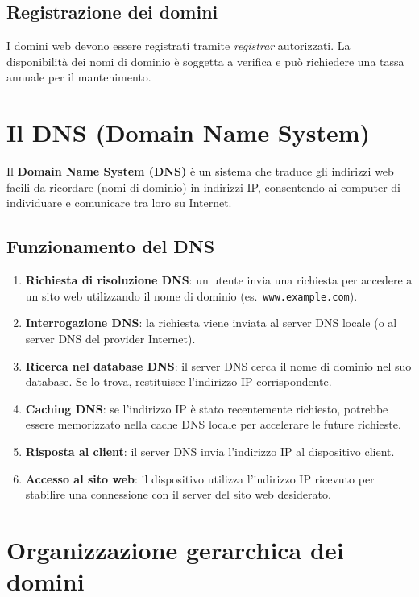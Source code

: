 \subsection{Registrazione dei domini}

I domini web devono essere registrati tramite \textit{registrar} autorizzati. La disponibilità dei nomi di dominio è soggetta a verifica e può richiedere una tassa annuale per il mantenimento.

\section{Il DNS (Domain Name System)}

Il \textbf{Domain Name System (DNS)} è un sistema che traduce gli indirizzi web facili da ricordare (nomi di dominio) in indirizzi IP, consentendo ai computer di individuare e comunicare tra loro su Internet.

\subsection{Funzionamento del DNS}

\begin{enumerate}
    \item \textbf{Richiesta di risoluzione DNS}: un utente invia una richiesta per accedere a un sito web utilizzando il nome di dominio (es.\ \texttt{www.example.com}).
    \item \textbf{Interrogazione DNS}: la richiesta viene inviata al server DNS locale (o al server DNS del provider Internet).
    \item \textbf{Ricerca nel database DNS}: il server DNS cerca il nome di dominio nel suo database. Se lo trova, restituisce l'indirizzo IP corrispondente.
    \item \textbf{Caching DNS}: se l'indirizzo IP è stato recentemente richiesto, potrebbe essere memorizzato nella cache DNS locale per accelerare le future richieste.
    \item \textbf{Risposta al client}: il server DNS invia l'indirizzo IP al dispositivo client.
    \item \textbf{Accesso al sito web}: il dispositivo utilizza l'indirizzo IP ricevuto per stabilire una connessione con il server del sito web desiderato.
\end{enumerate}

\section{Organizzazione gerarchica dei domini}

